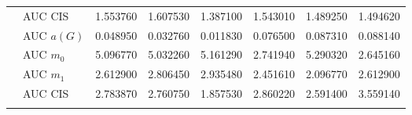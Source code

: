 \begin{table}[htbp]
\begin{tabular}{llrrrrrr}
    & AUC CIS & 1.553760 & 1.607530 & 1.387100 & 1.543010 & 1.489250 & 1.494620 \\
    \addlinespace
    \multirow{4}{*}{random} & AUC $a(G)$ & 0.048950 & 0.032760 & 0.011830 & 0.076500 & 0.087310 & 0.088140 \\
    & AUC $m_0$ & 5.096770 & 5.032260 & 5.161290 & 2.741940 & 5.290320 & 2.645160 \\
    & AUC $m_1$ & 2.612900 & 2.806450 & 2.935480 & 2.451610 & 2.096770 & 2.612900 \\
    & AUC CIS & 2.783870 & 2.760750 & 1.857530 & 2.860220 & 2.591400 & 3.559140 \\
    \addlinespace
    \bottomrule
  \end{tabular}
\end{table}

